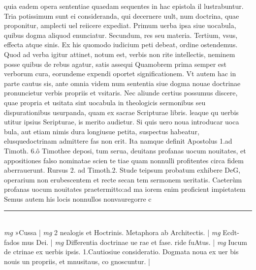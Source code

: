 \documentclass{article}
\begin{document}
\begin{pages}
quia eadem opera sententiae quaedam sequentes in hac epistola il lustrabuntur. Tria potissimum sunt ei consideranda, qui decernere uult, num doctrina, quae proponitur, amplecti uel reiicere expediat. Primum uerba ipsa siue uocabula, quibus dogma aliquod enunciatur. Secundum, res seu materia. Tertium, vsus, effecta atque  sinis. Ex his quomodo iudicium peti debeat, ordine ostendemus. Quod ad verba igitur attinet, notum est, verbis non rite intellectis, neminem posse quibus de rebus agatur, satis assequi Quamobrem prima semper est verborum cura, eorundeme expendi oportet significationem. Vt autem hac in parte cautus sis, ante omnia videm num sententia siue dogma nouae doctrinae pronuncietur verbis propriis et vsitaris. Nec aliunde certius possumus discere, quae propria et usitata sint uocabula in theologicis sermonibus seu dispurationibus usurpanda, quam ex sacrae Scripturae libris. leaque  qu uerbis utitur ipsius Seripturae, is merito audietur. Si quis uero noua introducar uoca bula, aut etiam nimis dura longiusue petita, suspectus habeatur, elusquedoctrinam admittere fas non erit. Ita namque  definit Apostolus 1.ad Timoth. 6.ô Timothee deposi, tum serua, deuitans profanas uocum nouitates, et appositiones falso nominatae scien te tiae quam nonnulli profitentes circa fidem aberrauerunt. Rursus 2. ad Timoth.2.  Stude teipsum probatum exhibere DeG, operarium non erubescentem et recte secan   tem sermonem ueritatis. Caeterùm profanas uocum nouitates praetermitto:ad ma   iorem enim proficient impietatem Semus autem his locis nonnullos nonvauregorre c\pend
\vspace{0.5cm}\noindent
\vspace{0.2cm}\rule{1cm}{0.2pt}\\ 
\hspace{0.2cm}\textit{mg}
\footnotesize »Cussa
\normalsize| 
\hspace{0.2cm}\textit{mg}
\footnotesize  2  nealogis et Hoctrinis. Metaphora ab Architectis. 
\normalsize| 
\hspace{0.2cm}\textit{mg}
\footnotesize Ecdt-fados mus Dei. 
\normalsize| 
\hspace{0.2cm}\textit{mg}
\footnotesize Differentia doctrinae ue rae et fase. ride fuAtus. 
\normalsize| 
\hspace{0.2cm}\textit{mg}
\footnotesize Iucum de ctrinae ex uerbis ipsis. 1.Cautiosiue consideratio. Dogmata noua ex uer bis nouis un propriis, et mnusitaus, co gnoscuntur. 
\normalsize| 

\end{pages}
\end{document}
